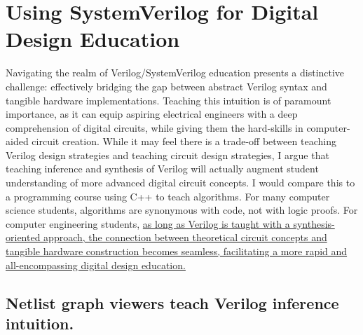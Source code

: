 
\chapter{Using SystemVerilog for Digital Design Education}
\label{chapter:digital_design}

Navigating the realm of Verilog/SystemVerilog education presents a distinctive challenge: effectively bridging the gap between abstract Verilog syntax and tangible hardware implementations. Teaching this intuition is of paramount importance, as it can equip aspiring electrical engineers with a deep comprehension of digital circuits, while giving them the hard-skills in computer-aided circuit creation. While it may feel there is a trade-off between teaching Verilog design strategies and teaching circuit design strategies, I argue that teaching inference and synthesis of Verilog will actually augment student understanding of more advanced digital circuit concepts. I would compare this to a programming course using C++ to teach algorithms. For many computer science students, algorithms are synonymous with code, not with logic proofs. For computer engineering students, \ul{as long as Verilog is taught with a synthesis-oriented approach, the connection between theoretical circuit concepts and tangible hardware construction becomes seamless, facilitating a more rapid and all-encompassing digital design education.}

\section{Netlist graph viewers teach Verilog inference intuition.}



